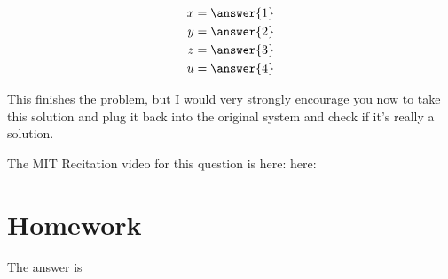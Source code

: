 \documentclass{ximera}
\begin{document}
\begin{question}
\begin{solution}
\begin{align*}
x = \answer{1}\\
y = \answer{2}\\
z = \answer{3}\\
u = \answer{4}\\
\end{align*}

This finishes the problem, but I would very strongly encourage you now to take this solution and plug it back into the original system and check if it's really a solution.

\end{solution}
\end{question}


The MIT Recitation video for this question is here:
here:

\section*{Homework}

\begin{question}
\begin{solution}
\begin{hint}
\end{hint}
The answer is 
\end{solution}
\end{question}
\end{document}
